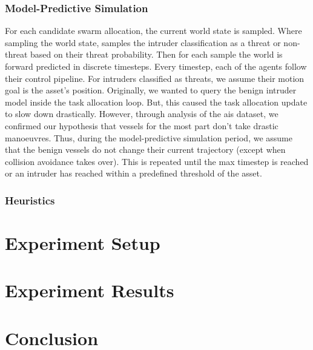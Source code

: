 \documentclass[bsc,frontabs,twoside,singlespacing,parskip,deptreport]{infthesis}     %
\begin{document}
\subsection{Model-Predictive Simulation}
\label{ss:mpsimulation}
For each candidate swarm allocation, the current world state is sampled. Where sampling the world state, samples the intruder classification as a threat or non-threat based on their threat probability. Then for each sample the world is forward predicted in discrete timesteps. Every timestep, each of the agents follow their control pipeline. For intruders classified as threats, we assume their motion goal is the asset's position. Originally, we wanted to query the benign intruder model inside the task allocation loop. But, this caused the task allocation update to slow down drastically. However, through analysis of the ais dataset, we confirmed our hypothesis that vessels for the most part don't take drastic manoeuvres. Thus, during the model-predictive simulation period, we assume that the benign vessels do not change their current trajectory (except when collision avoidance takes over). This is repeated until the max timestep is reached or an intruder has reached within a predefined threshold of the asset.

\subsection{Heuristics}
\label{ss:heuristics}

\chapter{Experiment Setup}
\chapter{Experiment Results}
\chapter{Conclusion}
\appendix

% 

\end{document}
